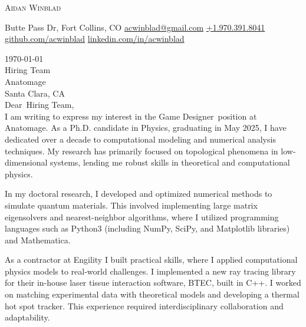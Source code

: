 \documentclass[12pt]{letter}
\makeatletter
\newcommand{\myname}{Aidan Winblad} %
\newcommand{\myemail}{acwinblad@gmail.com} %
\newcommand{\mylinkedin}{acwinblad} %
\newcommand{\mygithub}{acwinblad} %
\newcommand{\myphone}{+1.970.391.8041} %
\newcommand{\mylocation}{1007 Butte Pass Dr, Fort Collins, CO} %
\newcommand{\recipient}{Hiring Team} %
\newcommand{\greeting}{Dear} %
\newcommand{\position}{Game Designer} %
\newcommand{\company}{Anatomage} %
\newcommand{\street}{} %
\newcommand{\city}{Santa Clara} %
\newcommand{\state}{CA} %
\newcommand{\zip}{} %
\makeatother
\begin{document}
\AddToShipoutPictureBG{%
\color{gr}
\AtPageUpperLeft{\rule[-1.4in]{\paperwidth}{1.3in}}
}

\begin{center}
{\fontsize{28}{0}\selectfont\scshape \myname}

\faMapMarker\enspace\mylocation\hfill
\href{mailto:\myemail}{\faEnvelope\enspace \myemail}\hfill
\href{tel:\myphone}{\faPhone\enspace \myphone}\hfill
\href{https://github.com/\mygithub}{\faGithubSquare\enspace github.com/\mygithub}\hfill
\href{https://linkedin.com/in/\mylinkedin}{\faLinkedinIn\enspace linkedin.com/in/\mylinkedin}\hfill
\end{center}

\vspace{0.2in}

\today\\

\vspace{-0.1in}\recipient\\
\company\\
\city, \state\\ %

\vspace{-0.1in}\greeting\ \recipient,\\

\vspace{-0.1in}\setlength\parindent{24pt}
I am writing to express my interest in the \position\ position at \company.
As a Ph.D. candidate in Physics, graduating in May 2025, I have dedicated over a decade to computational modeling and numerical analysis techniques.
My research has primarily focused on topological phenomena in low-dimensional systems, lending me robust skills in theoretical and computational physics.

In my doctoral research, I developed and optimized numerical methods to simulate quantum materials.
This involved implementing large matrix eigensolvers and nearest-neighbor algorithms, where I utilized programming languages such as Python3 (including NumPy, SciPy, and Matplotlib libraries) and Mathematica.

As a contractor at Engility I built practical skills, where I applied computational physics models to real-world challenges.
I implemented a new ray tracing library for their in-house laser tissue interaction software, BTEC, built in C++.
I worked on matching experimental data with theoretical models and developing a thermal hot spot tracker.
This experience required interdisciplinary collaboration and adaptability.
\end{document}

